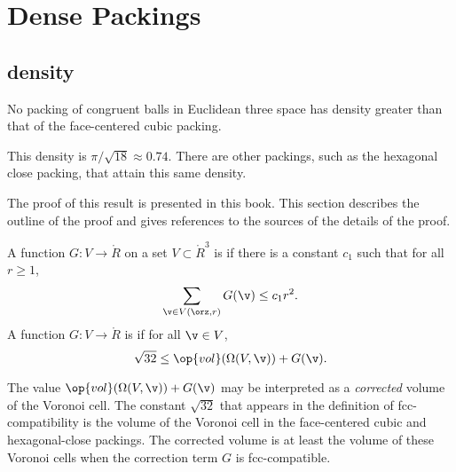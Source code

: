 \section{Dense Packings}

\subsection{density}


\begin{theorem}
\label{theorem:kepler}   No packing of congruent balls in
Euclidean three space has density greater than that of the
face-centered cubic packing.
\end{theorem}

\begin{remark}
This density is $\pi/\sqrt{18}\approx 0.74.$  There are other
packings, such as the hexagonal close packing, that attain this
same density.
\end{remark}

The proof of this result is presented in this book. This section
describes the outline of the proof and gives references to
the sources of the details of the proof.



\begin{definition}\label{def:negligible}
A function $G:V\to \ring{R}$ on a set $V\subset\ring{R}^3$
is 
if there is a constant $c_1$ such that for all $r\ge1$,
\begin{displaymath}\sum_{\v\in V(\orz,r)} G(\v) \le c_1
r^2.\end{displaymath}
A function $G: V\to\ring{R}$ is
if for all $\v\in V$, 
\begin{displaymath}\sqrt{32}\le \op{vol}(\Omega(V,\v)) +
G(\v).\end{displaymath}
%
%
%
\end{definition}


\begin{remark}
The value $\op{vol}(\Omega(V,\v)) + G(\v)$ may be interpreted as a
{\it corrected\/} volume of the Voronoi cell. The constant
$\sqrt{32}$ that appears in the definition of fcc-compatibility is
the volume of the Voronoi cell in the face-centered cubic and
hexagonal-close packings.  The corrected volume is at least the
volume of these Voronoi cells when the correction term $G$ is
fcc-compatible.  %
\end{remark}

